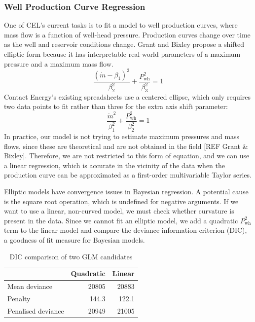 \documentclass[a4paper, 12pt]{article}
\begin{document}
\subsubsection{Well Production Curve Regression}
One of CEL's current tasks is to fit a model to well production curves, where mass flow is a function of well-head pressure. Production curves change over time as the well and reservoir conditions change. Grant and Bixley propose a shifted elliptic form because it has interpretable real-world parameters of a maximum pressure and a maximum mass flow.
\begin{equation}
\frac{\left( \dot{m}-\beta_1 \right)^2}{\beta_2^2} + \frac{P_\text{wh}^2}{\beta_3^2} = 1
\end{equation}
Contact Energy's existing spreadsheets use a centered ellipse, which only requires two data points to fit rather than three for the extra axis shift parameter:
\begin{equation}
\frac{\dot{m}^2}{\beta_1^2} + \frac{P_\text{wh}^2}{\beta_2^2} = 1
\end{equation}
In practice, our model is not trying to estimate maximum pressures and mass flows, since these are theoretical and are not obtained in the field [REF Grant \& Bixley]. Therefore, we are not restricted to this form of equation, and we can use a linear regression, which is accurate in the vicinity of the data when the production curve can be approximated as a first-order multivariable Taylor series.

Elliptic models have convergence issues in Bayesian regression. A potential cause is the square root operation, which is undefined for negative arguments. If we want to use a linear, non-curved model, we must check whether curvature is present in the data. Since we cannot fit an elliptic model, we add a quadratic $P_\text{wh}^2$ term to the linear model and compare the deviance information criterion (DIC), a goodness of fit measure for Bayesian models. 

\begin{table}[ht]
\centering
\begin{tabular}{lrr}
  \hline
& Quadratic & Linear \\ 
  \hline
Mean deviance & 20805 & 20883 \\
Penalty & 144.3 & 122.1 \\
Penalised deviance & 20949 & 21005\\
   \hline
\end{tabular}
\caption{DIC comparison of two GLM candidates} 
\label{tab:curvature}
\end{table}
\end{document}
